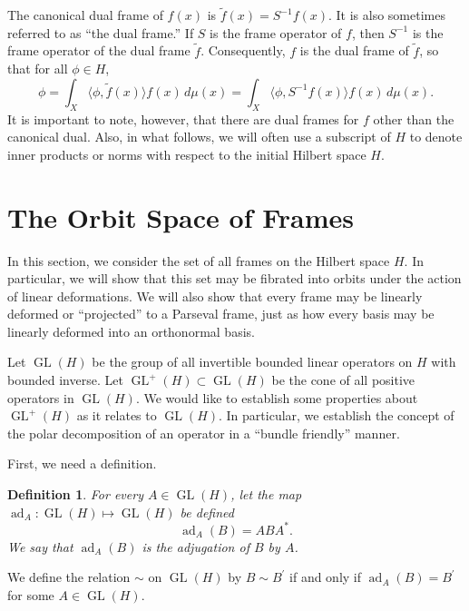 \documentclass{article}
\newtheorem{defn}{Definition}
\newcommand{\ad}{\operatorname{ad}}
\newcommand{\GL}{\operatorname{GL}}
\newcommand{\brak}[1]{\langle #1\rangle}
\begin{document}
The canonical dual frame of $f(x)$ is $\tilde{f}(x) = S^{-1}f(x)$. It is also sometimes referred to as ``the dual frame.''  If $S$ is the frame operator of $f$, then $S^{-1}$ is the frame operator of the dual frame $\tilde{f}$. Consequently, $f$ is the dual frame of $\tilde{f}$, so that for all $\phi\in H$,
\begin{equation}
\phi = \int_X\brak{\phi, \tilde{f}(x)} f(x)\,d\mu(x)
= \int_X\brak{\phi, S^{-1}f(x)} f(x)\,d\mu(x).
\end{equation}
It is important to note, however, that there are dual frames for $f$ other than the canonical dual. Also, in what follows, we will often use a subscript of $H$ to denote inner products or norms with respect to the initial Hilbert space $H$. 

\section{The Orbit Space of Frames}

In this section, we consider the set of all frames on the Hilbert space $H$. In particular, we will show that this set may be fibrated into orbits under the action of linear deformations. We will also show that every frame may be linearly deformed or ``projected'' to a Parseval frame, just as how every basis may be linearly deformed into an orthonormal basis.

Let $\GL(H)$ be the group of all invertible bounded linear operators on $H$ with bounded inverse. Let $\GL^+(H)\subset \GL(H)$ be the cone of all positive operators in $\GL(H)$. We would like to establish some properties about $\GL^+(H)$ as it relates to $\GL(H)$. In particular, we establish the concept of the polar decomposition of an operator in a ``bundle friendly''  manner. 

First, we need a definition.
\begin{defn}
For every $A\in \GL(H)$, let the map $\ad_A:\GL(H)\mapsto \GL(H)$ be defined $$\ad_A(B) = ABA^*.$$ We say that $\ad_A(B)$ is the \emph{adjugation} of $B$ by $A$.
\end{defn}

We define the relation $\sim$ on $\GL(H)$ by $B\sim B^\prime$ if and only if $\ad_A(B)=B^\prime$ for some $A\in\GL(H)$. 
\end{document}
